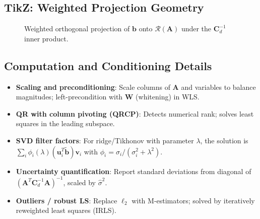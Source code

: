 \documentclass[11pt,a4paper]{article}
\begin{document}
\subsection{TikZ: Weighted Projection Geometry}
\begin{figure}[h!]
\centering
{}
\caption{Weighted orthogonal projection of $\mathbf{b}$ onto $\mathcal{R}(\mathbf{A})$ under the $\mathbf{C}_d^{-1}$ inner product.}
\end{figure}

\subsection{Computation and Conditioning Details}
\begin{itemize}
  \item \textbf{Scaling and preconditioning}: Scale columns of $\mathbf{A}$ and variables to balance magnitudes; left-precondition with $\mathbf{W}$ (whitening) in WLS.
  \item \textbf{QR with column pivoting (QRCP)}: Detects numerical rank; solves least squares in the leading subspace.
  \item \textbf{SVD filter factors}: For ridge/Tikhonov with parameter $\lambda$, the solution is $\sum_i \phi_i(\lambda)(\mathbf{u}_i^T\tilde{\mathbf{b}})\mathbf{v}_i$ with $\phi_i=\sigma_i/(\sigma_i^2+\lambda^2)$.
  \item \textbf{Uncertainty quantification}: Report standard deviations from diagonal of $(\mathbf{A}^T\mathbf{C}_d^{-1}\mathbf{A})^{-1}$, scaled by $\hat{\sigma}^2$.
  \item \textbf{Outliers / robust LS}: Replace $\ell_2$ with M-estimators; solved by iteratively reweighted least squares (IRLS).
\end{itemize}
\end{document}
